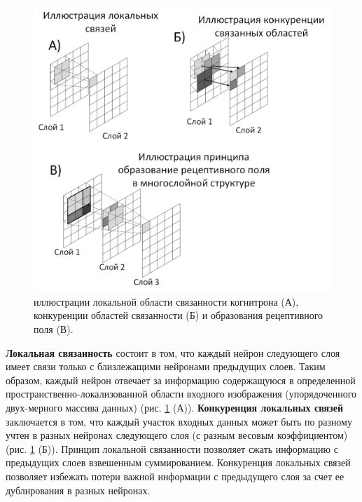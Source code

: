 \documentclass[12pt]{article}
\begin{document}
\begin{sloppypar}
    \begin{figure} [!h]
    	\begin{center}
    		\includegraphics[width=0.9\linewidth]{./figuresch1/Receptive_field_cognitron.png}
    		\caption{иллюстрации локальной области связанности когнитрона (А), конкуренции областей связанности (Б) и образования рецептивного поля (В).}		
    		\label{ch1:fig:Receptive_field_cognitron}
    	\end{center}
    \end{figure}

\textbf{Локальная связанность} состоит в том, что каждый нейрон следующего слоя имеет связи только с близлежащими нейронами предыдущих слоев. Таким образом, каждый нейрон отвечает за информацию содержащуюся в определенной пространственно-локализованной области входного изображения (упорядоченного двух-мерного массива данных) (рис. \ref{ch1:fig:Receptive_field_cognitron} (А)). 
\textbf{Конкуренция локальных связей} заключается в том, что каждый участок входных данных может быть по разному учтен в разных нейронах следующего слоя (с разным весовым коэффициентом) (рис. \ref{ch1:fig:Receptive_field_cognitron} (Б)). Принцип локальной связанности позволяет сжать информацию с предыдущих слоев взвешенным суммированием. Конкуренция локальных связей позволяет избежать потери важной информации с предыдущего слоя за счет ее дублирования в разных нейронах. 


\end{sloppypar}
\end{document}

